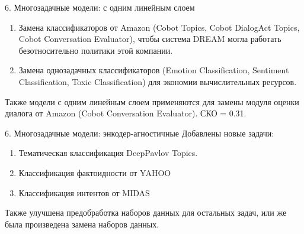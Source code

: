 \begin{frame}{6. Многозадачные модели: с одним линейным слоем}
\begin{enumerate}
\item Замена классификаторов от Amazon (Cobot Topics, Cobot DialogAct Topics, Cobot Conversation Evaluator), чтобы система DREAM могла работать безотносительно политики этой компании.
\item Замена однозадачных классификаторов (Emotion Classification, Sentiment Classification, Toxic Classification) для экономии вычислительных ресурсов.
\end{enumerate}
\begin{table}[htbp]
\caption{Точность на различных задачах для разных типов однозадачных моделей, в сравнении с многозадачными. }
\end{table}
\scriptsize Также модели с одним линейным слоем применяются для замены модуля оценки диалога от Amazon (Cobot Conversation Evaluator). СКО = 0.31.

\end{frame}


\begin{frame}{6. Многозадачные модели: энкодер-агностичные}
Добавлены новые задачи: 
\begin{enumerate}
    \item Тематическая классификация DeepPavlov Topics.
    \item Классификация фактоидности от YAHOO
    \item Классификация интентов от MIDAS
\end{enumerate}
 Также улучшена предобработка наборов данных для остальных задач, или же была произведена замена наборов данных.
\end{frame}

